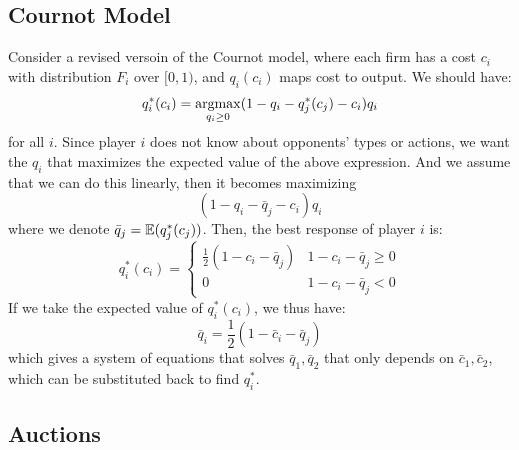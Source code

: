 \subsection{Cournot Model}
Consider a revised versoin of the Cournot model, where each firm has a cost $c_i$ with distribution $F_i$ over $[0, 1)$, and $q_i(c_i)$ maps cost to output. We should have:
$$q_i^*(c_i) = \operatorname*{argmax}_{q_i \ge 0} (1 - q_i - q_j^*(c_j) - c_i)q_i$$
for all $i$. Since player $i$ does not know about opponents' types or actions, we want the $q_i$ that maximizes the expected value of the above expression. And we assume that we can do this linearly, then it becomes maximizing
$$(1 - q_i - \bar{q}_j - c_i)q_i$$
where we denote $\bar{q}_j = \mathbb{E}(q_j^*(c_j))$. Then, the best response of player $i$ is:
$$q_i^*(c_i) = \begin{cases}
    \frac{1}{2}(1 - c_i - \bar{q}_j) & 1 - c_i - \bar{q}_j \ge 0 \\
    0 & 1 - c_i - \bar{q}_j < 0
\end{cases}$$
If we take the expected value of $q_i^*(c_i)$, we thus have:
$$\bar{q}_i = \frac{1}{2}(1 - \bar{c}_i - \bar{q}_j)$$
which gives a system of equations that solves $\bar{q}_1, \bar{q}_2$ that only depends on $\bar{c}_1, \bar{c}_2$, which can be substituted back to find $q_i^*$.

\subsection{Auctions}
